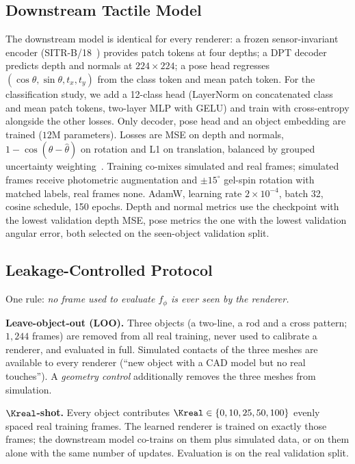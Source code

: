 \subsection{Downstream Tactile Model}
The downstream model is identical for every renderer: a frozen sensor-invariant encoder (SITR-B/18~\cite{gupta2025sitr}) provides patch tokens at four depths; a DPT decoder~\cite{ranftl2021dpt} predicts depth and normals at $224\times224$; a pose head regresses $(\cos\theta,\sin\theta,t_x,t_y)$ from the class token and mean patch token. For the classification study, we add a 12-class head (LayerNorm on concatenated class and mean patch tokens, two-layer MLP with GELU) and train with cross-entropy alongside the other losses. Only decoder, pose head and an object embedding are trained ($12$M parameters). Losses are MSE on depth and normals, $1-\cos(\theta-\hat\theta)$ on rotation and L1 on translation, balanced by grouped uncertainty weighting~\cite{kendall2018multi}. Training co-mixes simulated and real frames; simulated frames receive photometric augmentation and $\pm15^\circ$ gel-spin rotation with matched labels, real frames none. AdamW, learning rate $2\times10^{-4}$, batch 32, cosine schedule, 150 epochs. Depth and normal metrics use the checkpoint with the lowest validation depth MSE, pose metrics the one with the lowest validation angular error, both selected on the seen-object validation split.

\subsection{Leakage-Controlled Protocol}
\label{sec:protocol}
One rule: \emph{no frame used to evaluate $f_\phi$ is ever seen by the renderer.}

\noindent\textbf{Leave-object-out (LOO).} Three objects (a two-line, a rod and a cross pattern; $1{,}244$ frames) are removed from all real training, never used to calibrate a renderer, and evaluated in full. Simulated contacts of the three meshes are available to every renderer (``new object with a CAD model but no real touches''). A \emph{geometry control} additionally removes the three meshes from simulation.

\noindent\textbf{$\Kreal$-shot.} Every object contributes $\Kreal\in\{0,10,25,50,100\}$ evenly spaced real training frames. The learned renderer is trained on exactly those frames; the downstream model co-trains on them plus simulated data, or on them alone with the same number of updates. Evaluation is on the real validation split.

